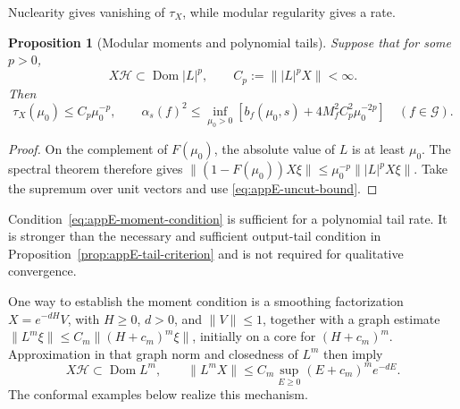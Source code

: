 \documentclass[a4paper,11pt]{article}
\newtheorem{proposition}[theorem]{Proposition}
\theoremstyle{definition}
\begin{document}
Nuclearity gives vanishing of $\tau_X$, while modular regularity gives a rate.

\begin{proposition}[Modular moments and polynomial tails]
\label{prop:appE-moment-tail}
Suppose that for some $p>0$,
\begin{equation}
 X\mathcal H\subset\operatorname{Dom}|L|^p,
 \qquad C_p:=\||L|^pX\|<\infty.
 \label{eq:appE-moment-condition}
\end{equation}
Then
\begin{equation}
 \tau_X(\mu_0)\le C_p\mu_0^{-p},
 \qquad
 \alpha_s(f)^2\le\inf_{\mu_0>0}
 \left[b_f(\mu_0,s)+4M_f^2C_p^2\mu_0^{-2p}\right]
 \quad(f\in\mathcal G).
 \label{eq:appE-polynomial-tail}
\end{equation}
\end{proposition}
\begin{proof}
On the complement of $F(\mu_0)$, the absolute value of $L$ is at least $\mu_0$. The spectral theorem therefore gives
$\|(1-F(\mu_0))X\xi\|\le\mu_0^{-p}\||L|^pX\xi\|$.
Take the supremum over unit vectors and use \eqref{eq:appE-uncut-bound}.
\end{proof}

Condition~\eqref{eq:appE-moment-condition} is sufficient for a polynomial tail rate. It is stronger than the necessary and sufficient output-tail condition in Proposition~\ref{prop:appE-tail-criterion} and is not required for qualitative convergence.

One way to establish the moment condition is a smoothing factorization
$X=e^{-dH}V$, with $H\ge0$, $d>0$, and $\|V\|\le1$, together with a graph estimate
$\|L^m\xi\|\le C_m\|(H+c_m)^m\xi\|$,
initially on a core for $(H+c_m)^m$. Approximation in that graph norm and closedness of $L^m$ then imply
\begin{equation}
 X\mathcal H\subset\operatorname{Dom}L^m,
 \qquad
 \|L^mX\|\le C_m\sup_{E\ge0}(E+c_m)^m e^{-dE}.
 \label{eq:appE-smoothing-criterion}
\end{equation}
The conformal examples below realize this mechanism.
\end{document}
